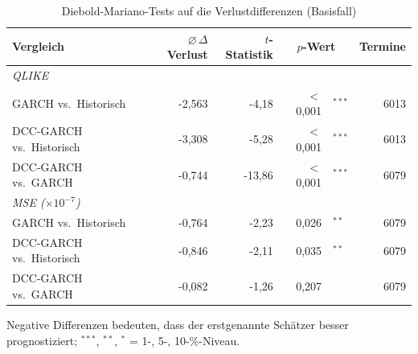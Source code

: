 \begin{table}[htbp]
  \centering
  \footnotesize
  \begin{tabular}{lrrr@{}lr}
    \toprule
    Vergleich & $\varnothing\,\Delta$ Verlust & $t$-Statistik & \multicolumn{2}{c}{$p$-Wert} & Termine \\
    \midrule
    \multicolumn{6}{l}{\textit{QLIKE}} \\
    \quad GARCH vs.\ Historisch & -2,563 & -4,18 & $<$0,001 & $^{***}$ & 6013 \\
    \quad DCC-GARCH vs.\ Historisch & -3,308 & -5,28 & $<$0,001 & $^{***}$ & 6013 \\
    \quad DCC-GARCH vs.\ GARCH & -0,744 & -13,86 & $<$0,001 & $^{***}$ & 6079 \\
    \midrule
    \multicolumn{6}{l}{\textit{MSE ($\times 10^{-7}$)}} \\
    \quad GARCH vs.\ Historisch & -0,764 & -2,23 & 0,026 & $^{**}$ & 6079 \\
    \quad DCC-GARCH vs.\ Historisch & -0,846 & -2,11 & 0,035 & $^{**}$ & 6079 \\
    \quad DCC-GARCH vs.\ GARCH & -0,082 & -1,26 & 0,207 &  & 6079 \\
    \bottomrule
  \end{tabular}
  \caption{Diebold-Mariano-Tests auf die Verlustdifferenzen (Basisfall)}
  \label{tab:dmw}
  \begin{minipage}{\linewidth}\vspace{0.4em}\centering\footnotesize
  Negative Differenzen bedeuten, dass der erstgenannte Schätzer besser prognostiziert; $^{***}$, $^{**}$, $^{*}$ = 1-, 5-, 10-\%-Niveau.
  \end{minipage}
\end{table}
